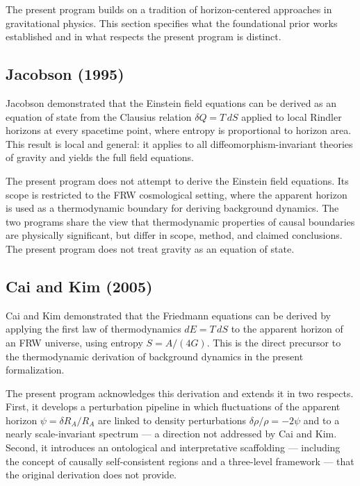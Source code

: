 \documentclass[12pt,a4paper]{article}
\begin{document}
The present program builds on a tradition of horizon-centered approaches in gravitational physics. This section specifies what the foundational prior works established and in what respects the present program is distinct.

\subsection*{Jacobson (1995)}

Jacobson demonstrated that the Einstein field equations can be derived as an equation of state from the Clausius relation $\delta Q = T\,dS$ applied to local Rindler horizons at every spacetime point, where entropy is proportional to horizon area. This result is local and general: it applies to all diffeomorphism-invariant theories of gravity and yields the full field equations.

The present program does not attempt to derive the Einstein field equations. Its scope is restricted to the FRW cosmological setting, where the apparent horizon is used as a thermodynamic boundary for deriving background dynamics. The two programs share the view that thermodynamic properties of causal boundaries are physically significant, but differ in scope, method, and claimed conclusions. The present program does not treat gravity as an equation of state.

\subsection*{Cai and Kim (2005)}

Cai and Kim demonstrated that the Friedmann equations can be derived by applying the first law of thermodynamics $dE = T\,dS$ to the apparent horizon of an FRW universe, using entropy $S = A/(4G)$. This is the direct precursor to the thermodynamic derivation of background dynamics in the present formalization.

The present program acknowledges this derivation and extends it in two respects. First, it develops a perturbation pipeline in which fluctuations of the apparent horizon $\psi = \delta R_A / R_A$ are linked to density perturbations $\delta\rho/\rho = -2\psi$ and to a nearly scale-invariant spectrum --- a direction not addressed by Cai and Kim. Second, it introduces an ontological and interpretative scaffolding --- including the concept of causally self-consistent regions and a three-level framework --- that the original derivation does not provide.
\end{document}
